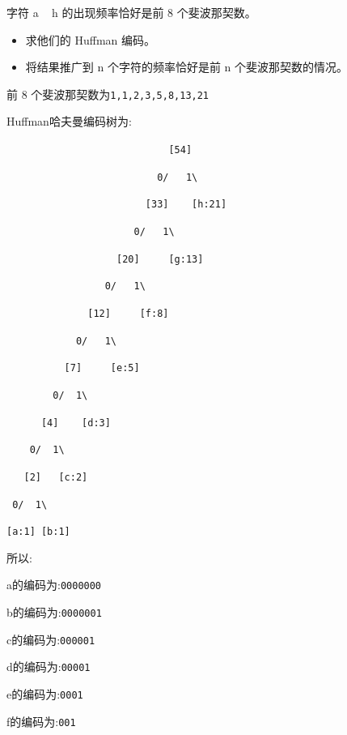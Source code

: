 \documentclass[../../main.tex]{subfiles}
\begin{document}
\begin{problem}
字符 a ~ h 的出现频率恰好是前 8 个斐波那契数。
\begin{itemize}
    \item 求他们的 Huffman 编码。
    \item 将结果推广到 n 个字符的频率恰好是前 n 个斐波那契数的情况。
\end{itemize}
\end{problem}
\begin{solution}

前 8 个斐波那契数为\verb|1,1,2,3,5,8,13,21|

Huffman哈夫曼编码树为:

\verb|                            [54]             |

\verb|                          0/   1\            |

\verb|                        [33]    [h:21]       |
  
\verb|                      0/   1\                |
      
\verb|                   [20]     [g:13]           |
        
\verb|                 0/   1\                     |
        
\verb|              [12]     [f:8]                 |
        
\verb|            0/   1\                          |
        
\verb|          [7]     [e:5]                      |
        
\verb|        0/  1\                               |
        
\verb|      [4]    [d:3]                           |
        
\verb|    0/  1\                                   |
        
\verb|   [2]   [c:2]                               |
        
\verb| 0/  1\                                      |
        
\verb|[a:1] [b:1]                                  |

所以:

a的编码为:\verb|0000000|

b的编码为:\verb|0000001|

c的编码为:\verb|000001|

d的编码为:\verb|00001|

e的编码为:\verb|0001|

f的编码为:\verb|001|


\end{solution}
\end{document}
